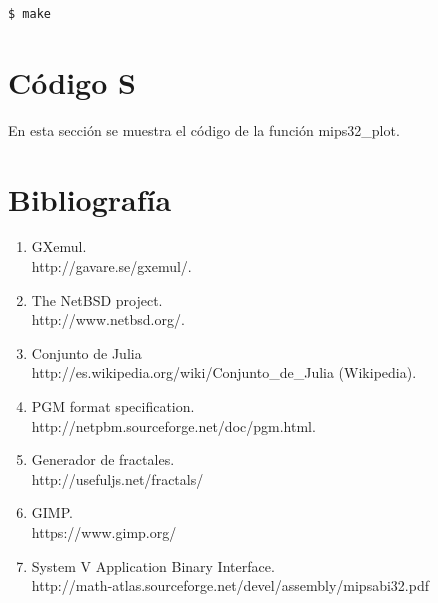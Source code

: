 \documentclass[a4paper,10pt]{article}
\begin{document}
\begin{lstlisting}[frame = single, language = bash, numbers=none]
$ make
\end{lstlisting}

\section{Código S}

En esta sección se muestra el código de la función mips32\_plot.



\newpage

\section{Bibliografía}
\begin{enumerate}
\item GXemul. \\ http://gavare.se/gxemul/.
\item The NetBSD project. \\
	http://www.netbsd.org/.
\item Conjunto de Julia \\ 
	http://es.wikipedia.org/wiki/Conjunto\_de\_Julia (Wikipedia).
\item PGM format specification.\\
	http://netpbm.sourceforge.net/doc/pgm.html.
\item Generador de fractales. \\
	http://usefuljs.net/fractals/
\item GIMP. \\
	https://www.gimp.org/
\item System V Application Binary Interface. \\
	http://math-atlas.sourceforge.net/devel/assembly/mipsabi32.pdf
\end{enumerate}
\end{document}
